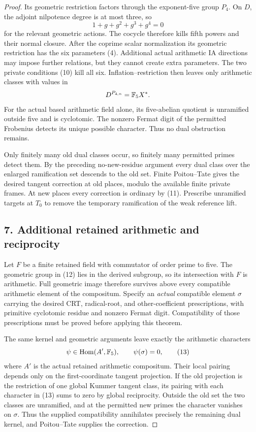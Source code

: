\documentclass[11pt]{article}
\begin{document}
\begin{proof}
Its geometric restriction factors through the exponent-five group $P_4$. On $D$, the adjoint nilpotence degree is at most three, so
\[
 1+g+g^2+g^3+g^4=0
\]
for the relevant geometric actions. The cocycle therefore kills fifth powers and their normal closure. After the coprime scalar normalization its geometric restriction has the six parameters (4). Additional actual arithmetic IA directions may impose further relations, but they cannot create extra parameters. The two private conditions (10) kill all six. Inflation--restriction then leaves only arithmetic classes with values in
\[
 D^{P_{4,n}}=\mathbb F_5X^*.
\]
For the actual based arithmetic field alone, its five-abelian quotient is unramified outside five and is cyclotomic. The nonzero Fermat digit of the permitted Frobenius detects its unique possible character. Thus no dual obstruction remains.

Only finitely many old dual classes occur, so finitely many permitted primes detect them. By the preceding no-new-residue argument every dual class over the enlarged ramification set descends to the old set. Finite Poitou--Tate gives the desired tangent correction at old places, modulo the available finite private frames. At new places every correction is ordinary by (11). Prescribe unramified targets at $T_0$ to remove the temporary ramification of the weak reference lift.

\subsection*{7. Additional retained arithmetic and reciprocity}
Let $F$ be a finite retained field with commutator of order prime to five. The geometric group in (12) lies in the derived subgroup, so its intersection with $F$ is arithmetic. Full geometric image therefore survives above every compatible arithmetic element of the compositum. Specify an \emph{actual} compatible element $\sigma$ carrying the desired CRT, radical-root, and other-coefficient prescriptions, with primitive cyclotomic residue and nonzero Fermat digit. Compatibility of those prescriptions must be proved before applying this theorem.

The same kernel and geometric arguments leave exactly the arithmetic characters
\[
 \psi\in\operatorname{Hom}(A',\mathbb F_5),\qquad \psi(\sigma)=0,
 \tag{13}
\]
where $A'$ is the actual retained arithmetic compositum. Their local pairing depends only on the first-coordinate tangent projection. If the old projection is the restriction of one global Kummer tangent class, its pairing with each character in (13) sums to zero by global reciprocity. Outside the old set the two classes are unramified, and at the permitted new primes the character vanishes on $\sigma$. Thus the supplied compatibility annihilates precisely the remaining dual kernel, and Poitou--Tate supplies the correction.


\end{proof}
\end{document}
